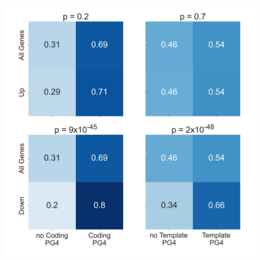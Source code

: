 \documentclass[12pt,a4paper,]{report}
\let\origfigure=\figure
\let\endorigfigure=\endfigure
\renewenvironment{figure}[1][2] {
    \expandafter\origfigure\expandafter[H]
} {
    \endorigfigure
}
\begin{document}
\begin{figure}[htbp]
\centering
\includegraphics[width=\textwidth,height=562pt,keepaspectratio]{chapter_5/figures/nmm_g4_presence_absence_chisquared.png}
\caption[NMM downregulated genes are enriched in PG4s]{\textbf{NMM   downregulated   genes   are   enriched   in   PG4s}   Heatmaps   showing   fractions   of   genes   containing   at   least   one   predicted   G4   in   their   gene   body   for   upregulated   genes   vs   all   genes   (top   row)   and   downregulated   genes   vs   all   genes   (bottom   row)   (For   down   and   upregulated   genes,   FDR   <   0.05   and   absolute   logFC   >   0.5).   PG4   predictions   for   the   coding   strand   are   in   the   left   hand   column   whilst   PG4   predictions   for   template   strand   are   on   the   right.   P   values   for   each   heatmap   are   calculated   using   Chi-squared   tests.   Genes   downregulated   by   NMM   show   a   particularly   strong   enrichment   of   PG4s,   and   particularly   on   the   template   strand.   \label{nmm_g4_sq}}
\end{figure}
\end{document}
